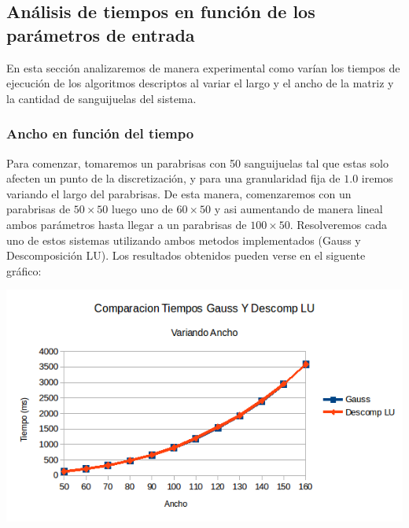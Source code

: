 \subsection{Análisis de tiempos en función de los parámetros de entrada}
En esta sección analizaremos de manera experimental como varían los tiempos de ejecución de los algoritmos descriptos al variar el largo y el ancho de la matriz y la cantidad de sanguijuelas del sistema.

\subsubsection{Ancho en función del tiempo}
Para comenzar, tomaremos un parabrisas con 50 sanguijuelas tal que estas solo afecten un punto de la discretización, y para una granularidad fija de $1.0$ iremos variando el largo del parabrisas. De esta manera, comenzaremos con un parabrisas de $50 \times 50$ luego uno de $60 \times 50$ y asi aumentando de manera lineal ambos parámetros hasta llegar a un parabrisas de $100 \times 50$. Resolveremos cada uno de estos sistemas utilizando ambos metodos implementados (Gauss y Descomposición LU). Los resultados obtenidos pueden verse en el siguente gráfico:

\begin{center}
 \includegraphics[width=400pt]{imagenes/testeo/anchoGauss.png}
\end{center}

